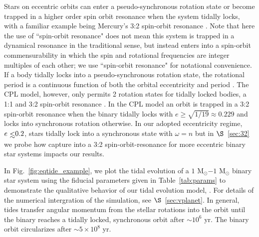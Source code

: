 Stars on eccentric orbits can enter a pseudo-synchronous rotation state or become trapped in a higher order spin orbit resonance when the system tidally locks, with a familiar example being Mercury's 3:2 spin-orbit resonance \citep{GoldreichPeale1966}.  Note that here the use of ``spin-orbit resonance" does not mean this system is trapped in a dynamical resonance in the traditional sense, but instead enters into a spin-orbit commensurability in which the spin and rotational frequencies are integer multiples of each other; we use ``spin-orbit resonance" for notational convenience.  If a body tidally locks into a pseudo-synchronous rotation state, the rotational period is a continuous function of both the orbital eccentricity and period \citep[see][]{Goldreich1966b,Wisdom2008}.  The CPL model, however, only permits 2 rotation states for tidally locked bodies, a 1:1 and 3:2 spin-orbit resonance \citep{Barnes2017}.  In the CPL model an orbit is trapped in a 3:2 spin-orbit resonance when the binary tidally locks with $e \geq \sqrt{1/19} \approx 0.229$ \citep{FerrazMello2008} and locks into synchronous rotation otherwise.  In our adopted eccentricity regime, $e \lsim 0.2$, stars tidally lock into a synchronous state with $\omega = n$ but in $\S$~\ref{sec:32} we probe how capture into a 3:2 spin-orbit-resonance for more eccentric binary star systems impacts our results. 

In Fig.~\ref{fig:eqtide_example}, we plot the tidal evolution of a $1$ M$_{\odot}$$-1$ M$_{\odot}$ binary star system using the fiducial parameters given in Table~\ref{tab:params} to demonstrate the qualitative behavior of our tidal evolution model, \eqtide.  For details of the numerical intergration of the simulation, see $\S$~\ref{sec:vplanet}.  In general, tides transfer angular momentum from the stellar rotations into the orbit until the binary reaches a tidally locked, synchronous orbit after ${\sim}10^6$ yr.  The binary orbit circularizes after ${\sim} 5 \times 10^8$ yr.

